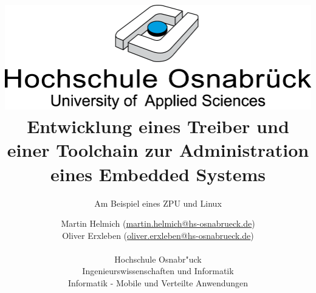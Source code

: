\documentclass[12pt]{scrartcl}
\begin{document}
\author{%
	Martin Helmich \small(\href{mailto:martin.helmich@hs-osnabrueck.de}{martin.helmich@hs-osnabrueck.de})\\%
	Oliver Erxleben \small(\href{mailto:oliver.erxleben@hs-osnabrueck.de}{oliver.erxleben@hs-osnabrueck.de})\\ \\%
	Hochschule Osnabr"uck \\%
	Ingenieurswissenschaften und Informatik \\%
	Informatik - Mobile und Verteilte Anwendungen }

\title{\includegraphics[scale=0.75,keepaspectratio]{img/hs_os.png}\linebreak \linebreak Entwicklung eines Treiber und einer Toolchain zur Administration eines Embedded Systems}
\subtitle{Am Beispiel eines ZPU und Linux}

\maketitle
\thispagestyle{empty}
\tableofcontents

\listoffigures

\lstlistoflistings
\end{document}
